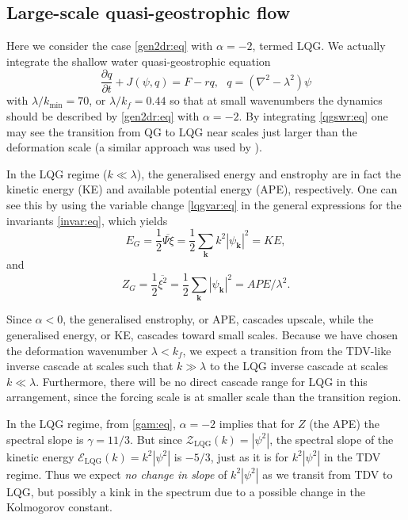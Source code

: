 \documentclass{jfm}
\newcommand{\ca}  [1]{\mathcal{#1}}
\newcommand{\kb}  {\boldsymbol{k}}
\newcommand{\del} {\nabla}
\newcommand{\p}   {\partial}
\newcommand{\pp}  [2]{\frac{\p #1}{\p #2}}
\begin{document}
\subsection{Large-scale quasi-geostrophic flow}
\label{lqg_exp:ssc}

Here we consider the case \eqref{gen2dr:eq} with $\alpha=-2$, termed
LQG.  We actually integrate the shallow water quasi-geostrophic
equation
\begin{equation}
\pp{q}{t} + J(\psi,q) = F - rq, ~~~ q = (\del^2 - \lambda^2)\psi
\label{qgswr:eq}
\end{equation}
with $\lambda/k_{\mathrm{min}}=70$, or $\lambda/k_f = 0.44$ so
that at small wavenumbers the dynamics should be described by
\eqref{gen2dr:eq} with $\alpha=-2$.  By integrating
\eqref{qgswr:eq} one may see the transition from QG to LQG near
scales just larger than the deformation scale (a similar approach
was used by \citet{kukharkin95}).

In the LQG regime ($k\ll\lambda$), the generalised energy and
enstrophy are in fact the kinetic energy (KE) and available potential
energy (APE), respectively.  One can see this by using the variable
change \eqref{lqgvar:eq} in the general expressions for the
invariants \eqref{invar:eq}, which yields
\begin{equation}
E_G = \frac{1}{2}\overline{\Psi\xi} =
\frac{1}{2}\sum_{\kb}k^2|\psi_{\kb}|^2 = KE,
\label{lqgE:eq}
\end{equation}
and
\begin{equation}
Z_G = \frac{1}{2}\overline{\xi^2} =
\frac{1}{2}\sum_{\kb}|\psi_{\kb}|^2 = APE/\lambda^2.
\label{lqgZ:eq}
\end{equation}

Since $\alpha < 0$, the generalised enstrophy, or APE, cascades
upscale, while the generalised energy, or KE, cascades toward small
scales.  Because we have chosen the deformation wavenumber
$\lambda<k_f$, we expect a transition from the TDV-like inverse
cascade at scales such that $k\gg\lambda$ to the LQG inverse cascade
at scales $k\ll\lambda$.  Furthermore, there will be no direct cascade
range for LQG in this arrangement, since the forcing scale is at
smaller scale than the transition region.

In the LQG regime, from \eqref{gam:eq}, $\alpha = -2$ implies that
for $Z$ (the APE) the spectral slope is $\gamma=11/3$.  But since
$\ca{Z}_{\mathrm{LQG}}(k) = |\psi^2|$, the spectral slope of the
kinetic energy $\ca{E}_{\mathrm{LQG}}(k) = k^2|\psi^2|$ is
$-5/3$, just as it is for $k^2|\psi^2|$ in the TDV regime.  Thus
we expect \textit{no change in slope} of $k^2|\psi^2|$ as we
transit from TDV to LQG, but possibly a kink in the spectrum
due to a possible change in the Kolmogorov constant.
\end{document}

